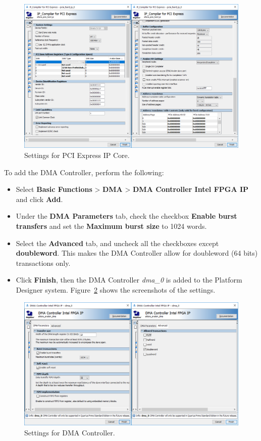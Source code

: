 \documentclass[11pt, twoside, pdftex]{article}
\begin{document}
\begin{figure}[H]
	\centering
	  \includegraphics[scale=0.55]{figures/pcie_ip_settings.png}
	\caption{Settings for PCI Express IP Core.} 
	\label{fig:pcie_ip_settings}
\end{figure}

To add the DMA Controller, perform the following:
	
\begin{itemize}
	\item Select {\bf Basic Functions} > {\bf DMA} > {\bf DMA Controller Intel FPGA IP} and click {\bf Add}. 
	\item Under the {\bf DMA Parameters} tab, check the checkbox {\bf Enable burst transfers} and set the {\bf Maximum burst size} to 1024 words. 
	\item Select the {\bf Advanced} tab, and uncheck all the checkboxes except {\bf doubleword}. This makes the DMA Controller allow for doubleword (64 bits) transactions only.
	\item Click {\bf Finish}, then the DMA Controller {\it dma\_0} is added to the Platform Designer system. Figure~\ref{fig:dma_settings} shows the screenshots of the settings. 
\end{itemize}

\begin{figure}[H]
	\centering
	  \includegraphics[scale=0.6]{figures/dma_settings.png}
	\caption{Settings for DMA Controller.} 
	\label{fig:dma_settings}
\end{figure}
	
\end{document}
